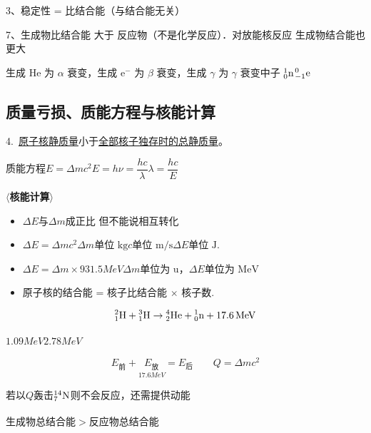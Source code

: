 3、稳定性 = 比结合能（与结合能无关）

7、生成物比结合能 大于 反应物（不是化学反应）．对放能核反应 生成物结合能也更大

生成 He 为 $\alpha$ 衰变，生成 $\mathrm{e}^-$ 为 $\beta$ 衰变，生成 $\gamma$ 为 $\gamma$ 衰变\quad 中子 ${}^{1}_{0}\mathrm{n}$\quad ${}^{0}_{-1}\mathrm{e}$

\subsection{质量亏损、质能方程与核能计算}
4.\ \underline{原子核静质量}小于\underline{全部核子独存时的总静质量}。 %

质能方程\quad $E=\Delta mc^2$\qquad $E=h\nu=\dfrac{hc}{\lambda}$\qquad $\lambda=\dfrac{hc}{E}$

\textbf{$\langle$核能计算$\rangle$} %
\begin{itemize}
\item[$\downarrow$] $\Delta E$与$\Delta m$成正比 但不能说相互转化
\item[] $\Delta E=\Delta mc^2$\quad $\Delta m$单位 $\mathrm{kg}$\quad $c$单位 $\mathrm{m/s}$\quad $\Delta E$单位 $\mathrm{J}$.
\item[] $\Delta E=\Delta m\times931.5\unit{MeV}$\quad $\Delta m$单位为 $\mathrm{u}$，$\Delta E$单位为 $\mathrm{MeV}$
\item[] 原子核的结合能 = 核子比结合能 $\times$ 核子数.
\end{itemize}

\[
{}^{2}_{1}\mathrm{H}+{}^{3}_{1}\mathrm{H}\to{}^{4}_{2}\mathrm{He}+{}^{1}_{0}\mathrm{n}+17.6\,\mathrm{MeV}
\]


$1.09\unit{MeV}$\quad $2.78\unit{MeV}$ %

\[
E_{\text{前}}+\underset{17.6\unit{MeV}}{E_{\text{放}}}=E_{\text{后}}\qquad Q=\Delta mc^2
\]

若\unclear{$\alpha$}以$Q$轰击${}^{14}_{7}\mathrm{N}$则不会反应，还需提供动能 %

生成物总结合能$>$反应物总结合能\ \textsuperscript{}

